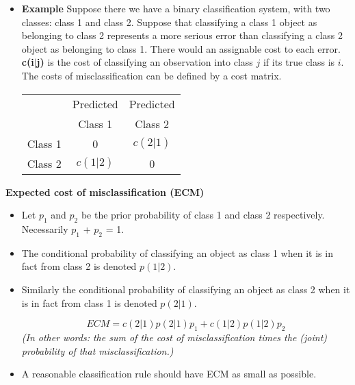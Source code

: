\documentclass[a4paper,12pt]{article}
\begin{document}
\begin{itemize}
	\item 	\textbf{Example} Suppose there we have a binary classification system, with two classes: class 1 and class 2.
	Suppose that classifying a class 1 object as belonging to class 2 represents a more serious error than classifying a class 2 object as belonging to class 1. There would an assignable cost to each error.
	\textbf{c(i$|$j)} is the cost of classifying an observation into class $j$ if its true class is $i$.
	The costs of misclassification can be defined by a cost matrix.
	
	\begin{center}
	\begin{tabular}{|c|c|c|}
		\hline
		& Predicted & Predicted \\
		& Class 1 & Class 2 \\  \hline
		Class 1 & 0 & $c(2|1)$  \\ \hline
		Class 2 & $c(1|2)$ & 0 \\
		\hline
	\end{tabular}
	\end{center}
	
\end{itemize}

\noindent \textbf{Expected cost of misclassification (ECM)}
\begin{itemize}
	\item Let $p_1$ and $p_2$ be the prior probability of class 1 and class 2 respectively.
	Necessarily $p_1$ + $p_2$ = 1.
	
\item	The conditional probability of classifying an object as class 1 when it is in fact from
	class 2 is denoted $p(1|2)$.
\item 	Similarly the conditional probability of classifying an object as class 2 when it is in
	fact from class 1 is denoted $p(2|1)$.
	
	\[ECM = c(2|1)p(2|1)p_1 + c(1|2)p(1|2)p_2\]
\textit{(In other words: the sum of the cost of misclassification times the (joint) probability of that misclassification.)}
	
\item 	A reasonable classification rule should have ECM as small as possible.
\end{itemize}
\end{document}
